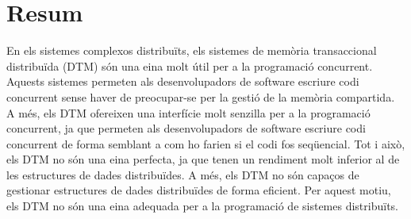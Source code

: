 \pagebreak
\thispagestyle{empty}
\section*{Resum}

En els sistemes complexos distribuïts, els sistemes de memòria transaccional distribuïda (DTM) són una eina molt útil per a la programació concurrent. Aquests sistemes permeten als desenvolupadors de software escriure codi concurrent sense haver de preocupar-se per la gestió de la memòria compartida. A més, els DTM ofereixen una interfície molt senzilla per a la programació concurrent, ja que permeten als desenvolupadors de software escriure codi concurrent de forma semblant a com ho farien si el codi fos seqüencial. Tot i això, els DTM no són una eina perfecta, ja que tenen un rendiment molt inferior al de les estructures de dades distribuïdes. A més, els DTM no són capaços de gestionar estructures de dades distribuïdes de forma eficient. Per aquest motiu, els DTM no són una eina adequada per a la programació de sistemes distribuïts.

\vfill